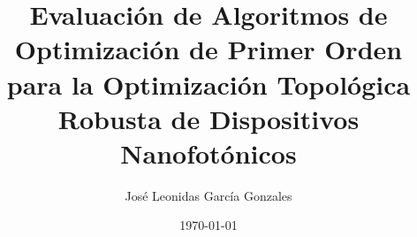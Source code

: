 \documentclass[a4paper, 12pt, oneside]{tesisutec}
\begin{document}
\frontmatter
{}

\title{Evaluación de Algoritmos de Optimización de Primer Orden para la Optimización Topológica 
Robusta de Dispositivos Nanofotónicos}
\author{José Leonidas García Gonzales}
\date{\today}

\maketitle
{}

%
%
%

\tableofcontents
\newpage
\listoftables
\newpage
\listoffigures


\mainmatter
\pagestyle{fancy}


%






%

\renewcommand{\bibname}{\large\bf{REFERENCIAS BIBLIOGRÁFICAS}}

%
\end{document}
